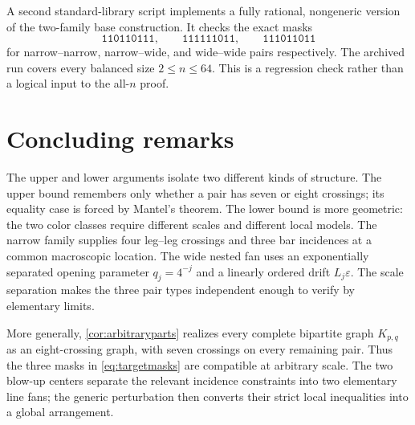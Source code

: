 \documentclass[11pt]{amsart}
\theoremstyle{definition}
\newcommand{\eps}{\varepsilon}
\begin{document}
A second standard-library script implements a fully rational, nongeneric
version of the two-family base construction.  It checks the exact masks
\[
 \texttt{110110111},\qquad
 \texttt{111111011},\qquad
 \texttt{111011011}
\]
for narrow--narrow, narrow--wide, and wide--wide pairs respectively.  The
archived run covers every balanced size $2\le n\le64$.  This is a regression
check rather than a logical input to the all-$n$ proof.

\section{Concluding remarks}

The upper and lower arguments isolate two different kinds of structure.
The upper bound remembers only whether a pair has seven or eight crossings;
its equality case is forced by Mantel's theorem.  The lower bound is more
geometric: the two color classes require different scales and different
local models.  The narrow family supplies four leg--leg crossings and three
bar incidences at a common macroscopic location.  The wide nested fan uses
an exponentially separated opening parameter $q_j=4^{-j}$ and a linearly
ordered drift $L_j\eps$.  The scale separation makes the three pair types
independent enough to verify by elementary limits.

More generally, \cref{cor:arbitraryparts} realizes every complete
bipartite graph $K_{p,q}$ as an eight-crossing graph, with seven crossings on
every remaining pair.  Thus the three masks in \eqref{eq:targetmasks} are
compatible at arbitrary scale.  The two blow-up centers separate the
relevant incidence constraints into two elementary line fans; the generic
perturbation then converts their strict local inequalities into a global
arrangement.



\end{document}
